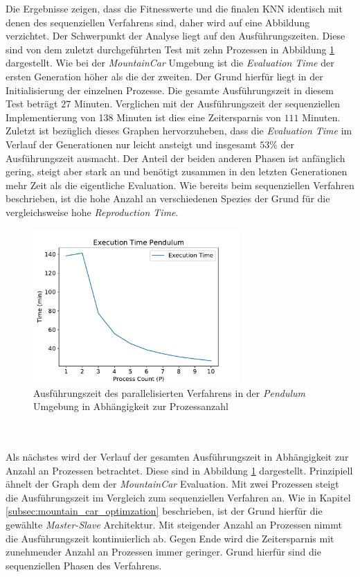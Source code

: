 Die Ergebnisse zeigen, dass die Fitnesswerte und die finalen \ac{KNN} identisch mit denen des sequenziellen Verfahrens sind, daher wird auf eine Abbildung verzichtet. Der Schwerpunkt der Analyse liegt auf den Ausführungszeiten. Diese sind von dem zuletzt durchgeführten Test mit zehn Prozessen in Abbildung \ref{fig:pendulum_execution_time_1_10} dargestellt. Wie bei der \emph{MountainCar} Umgebung ist die \emph{Evaluation Time} der ersten Generation höher als die der zweiten. Der Grund hierfür liegt in der Initialisierung der einzelnen Prozesse. Die gesamte Ausführungszeit in diesem Test beträgt $27$ Minuten. Verglichen mit der Ausführungszeit der sequenziellen Implementierung von 138 Minuten ist dies eine Zeitersparnis von $111$ Minuten. Zuletzt ist bezüglich dieses Graphen hervorzuheben, dass die \emph{Evaluation Time} im Verlauf der Generationen nur leicht ansteigt und insgesamt $53\%$ der Ausführungszeit ausmacht. Der Anteil der beiden anderen Phasen ist anfänglich gering, steigt aber stark an und benötigt zusammen in den letzten Generationen mehr Zeit als die eigentliche Evaluation. Wie bereits beim sequenziellen Verfahren beschrieben, ist die hohe Anzahl an verschiedenen Spezies der Grund für die vergleichsweise hohe \emph{Reproduction Time}.
\begin{figure}[!htb]
	\centering
	\includegraphics[width=0.7\textwidth]{./img/pendulum_analysis/pendulum_execution_1_1_10.pdf} 
	\caption{Ausführungszeit des parallelisierten Verfahrens in der \emph{Pendulum} Umgebung in Abhängigkeit zur Prozessanzahl}
	\label{fig:pendulum_execution_time_1_10}
\end{figure}
\\\\
Als nächstes wird der Verlauf der gesamten Ausführungszeit in Abhängigkeit zur Anzahl an Prozessen betrachtet. Diese sind in Abbildung \ref{fig:pendulum_execution_time_1_10} dargestellt. Prinzipiell ähnelt der Graph dem der \emph{MountainCar} Evaluation. Mit zwei Prozessen steigt die Ausführungszeit im Vergleich zum sequenziellen Verfahren an. Wie in Kapitel \ref{subsec:mountain_car_optimzation} beschrieben, ist der Grund hierfür die gewählte \emph{Master-Slave} Architektur. Mit steigender Anzahl an Prozessen nimmt die Ausführungszeit kontinuierlich ab. Gegen Ende wird die Zeitersparnis mit zunehmender Anzahl an Prozessen immer geringer. Grund hierfür sind die sequenziellen Phasen des Verfahrens. 
